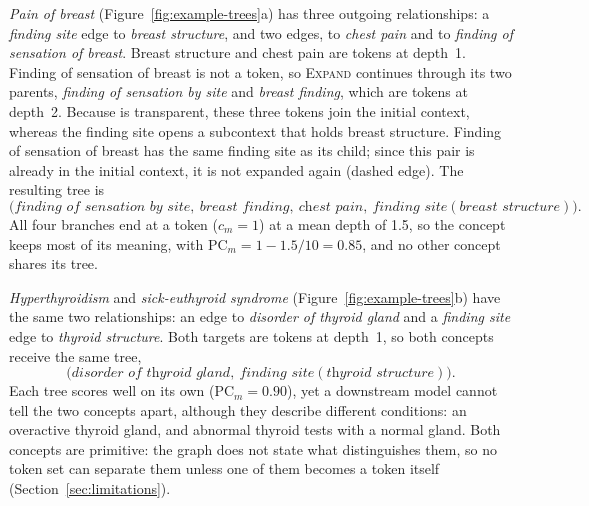 \textit{Pain of breast} (Figure~\ref{fig:example-trees}a) has three outgoing relationships: a \textit{finding site} edge to \textit{breast structure}, and two \isa{} edges, to \textit{chest pain} and to \textit{finding of sensation of breast}.
Breast structure and chest pain are tokens at depth~1.
Finding of sensation of breast is not a token, so \textsc{Expand} continues through its two parents, \textit{finding of sensation by site} and \textit{breast finding}, which are tokens at depth~2.
Because \isa{} is transparent, these three tokens join the initial context, whereas the finding site opens a subcontext that holds breast structure.
Finding of sensation of breast has the same finding site as its child; since this pair is already in the initial context, it is not expanded again (dashed edge).
The resulting tree is
\[
\big(\textit{finding of sensation by site},\ \textit{breast finding},\ \textit{chest pain},\ \textit{finding site}(\textit{breast structure})\big).
\]
All four branches end at a token ($c_m = 1$) at a mean depth of 1.5, so the concept keeps most of its meaning, with $\mathrm{PC}_m = 1 - 1.5/10 = 0.85$, and no other concept shares its tree.

\textit{Hyperthyroidism} and \textit{sick-euthyroid syndrome} (Figure~\ref{fig:example-trees}b) have the same two relationships: an \isa{} edge to \textit{disorder of thyroid gland} and a \textit{finding site} edge to \textit{thyroid structure}.
Both targets are tokens at depth~1, so both concepts receive the same tree,
\[
\big(\textit{disorder of thyroid gland},\ \textit{finding site}(\textit{thyroid structure})\big).
\]
Each tree scores well on its own ($\mathrm{PC}_m = 0.90$), yet a downstream model cannot tell the two concepts apart, although they describe different conditions: an overactive thyroid gland, and abnormal thyroid tests with a normal gland.
Both concepts are primitive: the graph does not state what distinguishes them, so no token set can separate them unless one of them becomes a token itself (Section~\ref{sec:limitations}).

